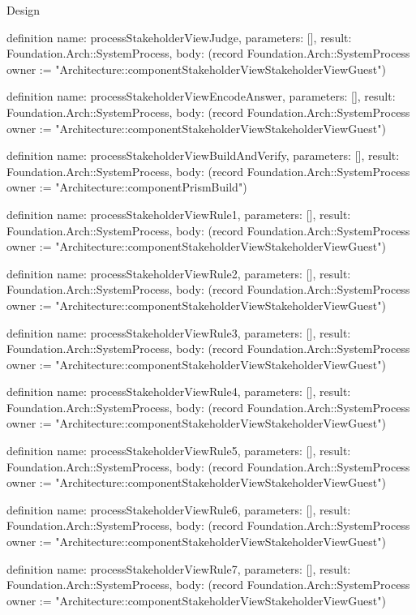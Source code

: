 \begin{lexlean}{Design}
\begin{semanticmodule}
definition{
  name: processStakeholderViewJudge,
  parameters: [],
  result: Foundation.Arch::SystemProcess,
  body: (record Foundation.Arch::SystemProcess {owner := "Architecture::componentStakeholderViewStakeholderViewGuest"})
}

definition{
  name: processStakeholderViewEncodeAnswer,
  parameters: [],
  result: Foundation.Arch::SystemProcess,
  body: (record Foundation.Arch::SystemProcess {owner := "Architecture::componentStakeholderViewStakeholderViewGuest"})
}

definition{
  name: processStakeholderViewBuildAndVerify,
  parameters: [],
  result: Foundation.Arch::SystemProcess,
  body: (record Foundation.Arch::SystemProcess {owner := "Architecture::componentPrismBuild"})
}

definition{
  name: processStakeholderViewRule1,
  parameters: [],
  result: Foundation.Arch::SystemProcess,
  body: (record Foundation.Arch::SystemProcess {owner := "Architecture::componentStakeholderViewStakeholderViewGuest"})
}

definition{
  name: processStakeholderViewRule2,
  parameters: [],
  result: Foundation.Arch::SystemProcess,
  body: (record Foundation.Arch::SystemProcess {owner := "Architecture::componentStakeholderViewStakeholderViewGuest"})
}

definition{
  name: processStakeholderViewRule3,
  parameters: [],
  result: Foundation.Arch::SystemProcess,
  body: (record Foundation.Arch::SystemProcess {owner := "Architecture::componentStakeholderViewStakeholderViewGuest"})
}

definition{
  name: processStakeholderViewRule4,
  parameters: [],
  result: Foundation.Arch::SystemProcess,
  body: (record Foundation.Arch::SystemProcess {owner := "Architecture::componentStakeholderViewStakeholderViewGuest"})
}

definition{
  name: processStakeholderViewRule5,
  parameters: [],
  result: Foundation.Arch::SystemProcess,
  body: (record Foundation.Arch::SystemProcess {owner := "Architecture::componentStakeholderViewStakeholderViewGuest"})
}

definition{
  name: processStakeholderViewRule6,
  parameters: [],
  result: Foundation.Arch::SystemProcess,
  body: (record Foundation.Arch::SystemProcess {owner := "Architecture::componentStakeholderViewStakeholderViewGuest"})
}

definition{
  name: processStakeholderViewRule7,
  parameters: [],
  result: Foundation.Arch::SystemProcess,
  body: (record Foundation.Arch::SystemProcess {owner := "Architecture::componentStakeholderViewStakeholderViewGuest"})
}


\end{semanticmodule}
\end{lexlean}
